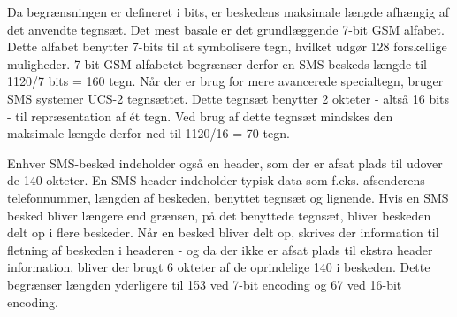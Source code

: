 Da begrænsningen er defineret i bits, er beskedens maksimale længde afhængig af det anvendte tegnsæt. Det mest basale er det grundlæggende 7-bit GSM alfabet. Dette alfabet benytter 7-bits til at symbolisere tegn, hvilket udgør 128 forskellige muligheder. 7-bit GSM alfabetet begrænser derfor en SMS beskeds længde til 1120/7 bits = 160 tegn. Når der er brug for mere avancerede specialtegn, bruger SMS systemer UCS-2 tegnsættet. Dette tegnsæt benytter 2 okteter - altså 16 bits - til repræsentation af ét tegn. Ved brug af dette tegnsæt mindskes den maksimale længde derfor ned til 1120/16 = 70 tegn. \cite{sms_pdu}

Enhver SMS-besked indeholder også en header\cite{sms_pdu}, som der er afsat plads til udover de 140 okteter. En SMS-header indeholder typisk data som f.eks. afsenderens telefonnummer, længden af beskeden, benyttet tegnsæt og lignende. Hvis en SMS besked bliver længere end grænsen, på det benyttede tegnsæt, bliver beskeden delt op i flere beskeder. Når en besked bliver delt op, skrives der information til fletning af beskeden i headeren - og da der ikke er afsat plads til ekstra header information, bliver der brugt 6 okteter af de oprindelige 140 i beskeden. Dette begrænser længden yderligere til 153 ved 7-bit encoding og 67 ved 16-bit encoding. 
